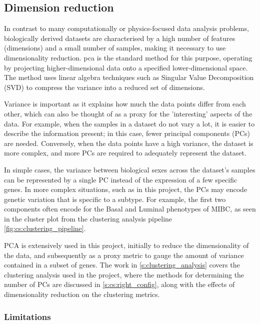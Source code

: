 \subsection{Dimension reduction} \label{s:lit:dim_red}

In contrast to many computationally or physics-focused data analysis problems, biologically derived datasets are characterised by a high number of features (dimensions) and a small number of samples, making it necessary to use dimensionality reduction. \acrfull{pca} \citep{Hotelling1936-qq, Pearson1901-zd} is the standard method for this purpose, operating by projecting higher-dimensional data onto a specified lower-dimensional space. The method uses linear algebra techniques such as Singular Value Decomposition (SVD) to compress the variance into a reduced set of dimensions.

Variance is important as it explains how much the data points differ from each other, which can also be thought of as a proxy for the 'interesting' aspects of the data. For example, when the samples in a dataset do not vary a lot, it is easier to describe the information present; in this case, fewer principal components (PCs) are needed. Conversely, when the data points have a high variance, the dataset is more complex, and more PCs are required to adequately represent the dataset.

In simple cases, the variance between biological sexes across the dataset's samples can be represented by a single PC instead of the expression of a few specific genes. In more complex situations, such as in this project, the PCs may encode genetic variation that is specific to a subtype. For example, the first two components often encode for the Basal and Luminal phenotypes of MIBC, as seen in the cluster plot from the clustering analysis pipeline \cref{fig:cs:clustering_pipeline}.

PCA is extensively used in this project, initially to reduce the dimensionality of the data, and subsequently as a proxy metric to gauge the amount of variance contained in a subset of genes. The work in \cref{s:clustering_analysis} covers the clustering analysis used in the project, where the methods for determining the number of PCs are discussed in \cref{s:cs:right_config}, along with the effects of dimensionality reduction on the clustering metrics.


\subsubsection*{Limitations}

